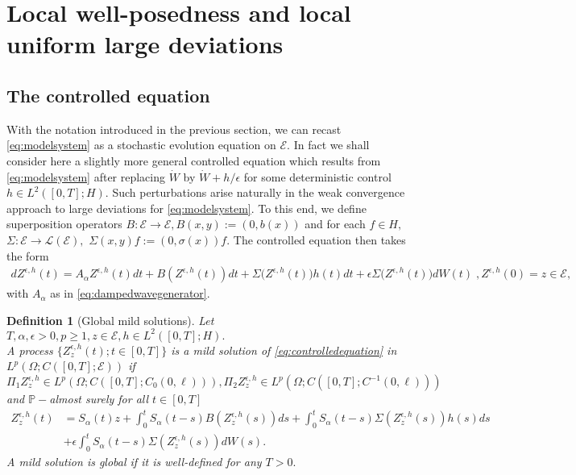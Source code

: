 \documentclass[10pt, reqno]{amsart}
\newcommand{\pr}{\mathbb{P}}
\newcommand{\e}{\mathcal{E}}
\newtheorem{dfn}{Definition}
\theoremstyle{definition}
\numberwithin{lem}{section}
\numberwithin{cor}{section}
\numberwithin{prop}{section}
\numberwithin{thm}{section}
\numberwithin{dfn}{section}
\begin{document}
 
\section{Local well-posedness and local uniform large deviations}\label{sec:wellposedness}
\subsection{The controlled equation}\label{SS:ControlledEquation}
With the notation introduced in the previous section, we can recast \eqref{eq:modelsystem} as a stochastic evolution equation on $\e.$ In fact we shall consider here a slightly more general controlled equation which results from \eqref{eq:modelsystem} after replacing $\dot{W}$ by $\dot{W}+h/\epsilon$ for some deterministic control  $h\in L^2([0,T];H).$ Such perturbations arise naturally in the weak convergence approach to large deviations for \eqref{eq:modelsystem}. 
To this end, we define superposition operators $B:\e\rightarrow\e, B(x,y):=(0, b(x))$ and for each $f\in H,$ $\Sigma:\e\rightarrow\mathscr{L}(\e),$ $ \Sigma(x,y)f:=(0, \sigma(x))f.$ The controlled equation then takes the form
\begin{equation}\label{eq:controlledequation}
     \begin{aligned}
        dZ^{\epsilon, h}(t)=A_\alpha Z^{\epsilon, h}(t)dt+B(Z^{\epsilon, h}(t))dt+\Sigma\big(Z^{\epsilon, h}(t)\big)h(t)dt+\epsilon\Sigma\big(Z^{\epsilon, h}(t)\big)dW(t)\;, Z^{\epsilon, h}(0)=z\in\e,
     \end{aligned}
 \end{equation}
 with $A_\alpha$ as in \eqref{eq:dampedwavegenerator}.

 \begin{dfn}[Global mild solutions]\label{dfn:mild solutions} Let $T, \alpha,\epsilon >0, p\geq 1, z\in\e, h\in L^2([0,T];H).$\\ A process $\{Z_z^{\epsilon, h}(t); t\in[0,T]\}$ is a mild solution of \eqref{eq:controlledequation} in $L^p(\Omega;     C([0,T];\e))$ if $$\Pi_1Z_z^{\epsilon, h}\in L^p(\Omega;     C([0,T];C_0(0,\ell))),
  \Pi_2Z_z^{\epsilon, h}\in L^p(\Omega;     C([0,T];C^{-1}(0,\ell)))  $$ and $\pr-$almost surely for all $t\in[0,T]$
 \begin{equation*}\label{eq:MildControlledSolution}
     \begin{aligned}
    Z_z^{\epsilon, h}(t)&=S_\alpha(t)z+\int_0^tS_{\alpha}(t-s)B(Z_z^{\epsilon, h}(s))ds+\int_0^tS_{\alpha}(t-s)\Sigma(Z_z^{\epsilon, h}(s))h(s)ds\\&+\epsilon\int_0^tS_{\alpha}(t-s)\Sigma(Z_z^{\epsilon, h}(s))dW(s).
     \end{aligned}
 \end{equation*}
 A mild solution is global if it is well-defined for any $T>0.$
 \end{dfn}
\end{document}
